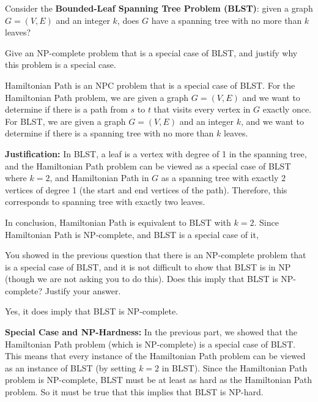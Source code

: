 \documentclass[11pt,fleqn]{exam}
\newenvironment{soln}{\color{solnblue}}{}
\newif\ifsolutions\solutionsfalse
\begin{document}
\begin{questions}

\question[4] Consider the \textbf{Bounded-Leaf Spanning Tree Problem (BLST)}: given a graph $G = (V,E)$ and an integer $k$, does $G$ have a spanning tree with no more than $k$ leaves?

Give an NP-complete problem that is a special case of BLST, and justify why this problem is a special case.

\begin{soln}
      Hamiltonian Path is an NPC problem that is a special case of BLST.
      For the Hamiltonian Path problem, we are given a graph $G = (V, E)$ 
      and we want to determine if there is a path
      from $s$ to $t$ that visits every vertex in $G$ exactly once.
      For BLST, we are given a graph $G = (V, E)$ and an integer $k$, 
      and we want to determine if there is a spanning tree with no more than $k$ 
      leaves.

      \textbf{Justification: }In BLST, a leaf is a vertex with degree of 1 
      in the spanning tree, and the Hamiltonian Path problem can be 
      viewed as a special case of BLST where $k = 2$, and Hamiltonian Path
      in $G$ as a spanning tree with exactly 2 vertices of degree 1
      (the start and end vertices of the path).
      Therefore, this corresponds to spanning tree with exactly two leaves.

      In conclusion, Hamiltonian Path is equivalent to BLST with $k = 2$.
      Since Hamiltonian Path is NP-complete, and BLST is a special case of it,
\end{soln}


\ifsolutions\fi

\question[3] You showed in the previous question that there is an NP-complete problem that is a special case of BLST, and it is not difficult to show that BLST is in NP (though we are not asking you to do this). Does this imply that BLST is NP-complete? Justify your answer.

\begin{soln}
      
Yes, it does imply that BLST is NP-complete.

\textbf{Special Case and NP-Hardness:} In the previous part, 
we showed that the Hamiltonian Path problem 
(which is NP-complete) is a special case of BLST. 
This means that every instance of the Hamiltonian Path problem can 
be viewed as an instance of BLST (by setting 
$k = 2$ in BLST). Since the Hamiltonian Path problem is NP-complete, 
BLST must be at least as hard as the Hamiltonian Path problem. 
So it must be true that this implies that BLST is NP-hard.


\end{soln}
\end{questions}
\end{document}
